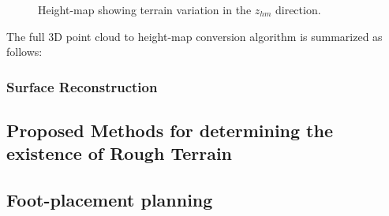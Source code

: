 				\begin{figure}[h!]
					\centering
					\caption{Height-map showing terrain variation in the $z_{hm}$ direction.}
					\label{fig::heightmap_terrain_patch_ortho}
				\end{figure}							
			
			The full 3D point cloud to height-map conversion algorithm is summarized as follows:


			\subsubsection{Surface Reconstruction}


		\subsection{Proposed Methods for determining the existence of Rough Terrain}

		\subsection{Foot-placement planning}


